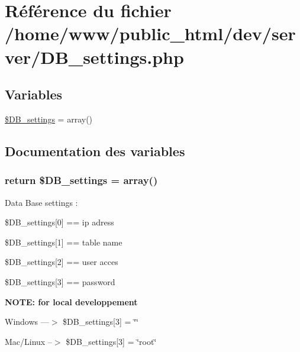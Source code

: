 \hypertarget{_d_b__settings_8php}{\section{Référence du fichier /home/www/public\-\_\-html/dev/server/\-D\-B\-\_\-settings.php}
\label{_d_b__settings_8php}
}
\subsection*{Variables}
\begin{DoxyCompactItemize}
\item 
\hyperlink{_d_b__settings_8php_a6ab31640096bdadca5e526746d474aed}{\$\-D\-B\-\_\-settings} = array()
\end{DoxyCompactItemize}


\subsection{Documentation des variables}
\hypertarget{_d_b__settings_8php_a6ab31640096bdadca5e526746d474aed}{
\subsubsection[{\$\-D\-B\-\_\-settings}]{\setlength{\rightskip}{0pt plus 5cm}return \$D\-B\-\_\-settings = array()}}\label{_d_b__settings_8php_a6ab31640096bdadca5e526746d474aed}
Data Base settings \-: 

\$\-D\-B\-\_\-settings\mbox{[}0\mbox{]} == ip adress \par
 \$\-D\-B\-\_\-settings\mbox{[}1\mbox{]} == table name \par
 \$\-D\-B\-\_\-settings\mbox{[}2\mbox{]} == user acces \par
 \$\-D\-B\-\_\-settings\mbox{[}3\mbox{]} == password \par


{\bfseries  N\-O\-T\-E\-: for local developpement } \par
 Windows ---$>$ \$\-D\-B\-\_\-settings\mbox{[}3\mbox{]} = \char`\"{}\char`\"{} \par
 Mac/\-Linux --$>$ \$\-D\-B\-\_\-settings\mbox{[}3\mbox{]} = \char`\"{}root\char`\"{} \par
 